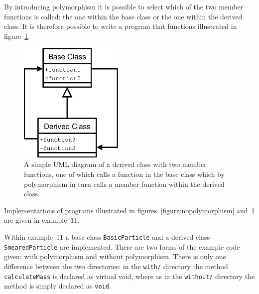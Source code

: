 \documentclass[11pt,a4paper]{scrartcl}
\begin{document}
By introducing polymorphism it is possible to select which of the two
member functions is called: the one within the base class or the one
within the derived class.  It is therefore possible to write a program
that functions illustrated in figure~\ref{figure:polymorphism}.
%
\begin{figure}[h]
\begin{center}
\includegraphics[width=5cm]{figures/polymorphism.eps}
\caption{A simple UML diagram of a derived class with two member functions, one of which calls a function in the base class which by polymorphism in turn calls a member function within the derived class.
\label{figure:polymorphism}}
\end{center}
\end{figure}
%
Implementations of programs illustrated in figures~\ref{figure:nopolymorphism}
and~\ref{figure:polymorphism} are given in example~11.

Within example~11 a base class \texttt{BasicParticle} and a derived
class \texttt{SmearedParticle} are implemented.  There are two forms
of the example code given: with polymorphism and without polymorphism.
There is only one difference between the two directories: in the
\texttt{with/} directory the method \texttt{calculateMass} is declared
as virtual void, where as in the \texttt{without/} directory the method is
simply declared as \texttt{void}.
\end{document}
